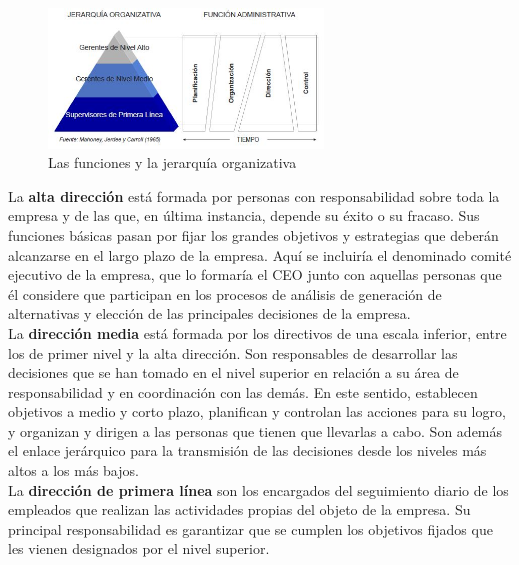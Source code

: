 \documentclass[12pt]{article}
\theoremstyle{definition_wo_parentheses}
\begin{document}
\begin{figure}[H]
\centering
\includegraphics[width=0.65\textwidth]{jerarquia}
\caption{Las funciones y la jerarquía organizativa}
\label{fig:jerarquia}
\end{figure}

La \textbf{alta dirección} está formada por personas con responsabilidad sobre toda la empresa y de las que, en última instancia, depende su éxito o su fracaso. Sus funciones básicas pasan por fijar los grandes objetivos y estrategias que deberán alcanzarse en el largo plazo de la empresa. Aquí se incluiría el denominado comité ejecutivo de la empresa, que lo formaría el CEO junto con aquellas personas que él considere que participan en los procesos de análisis de generación de alternativas y elección de las principales decisiones de la empresa.\\

La \textbf{dirección media} está formada por los directivos de una escala inferior, entre los de primer nivel y la alta dirección. Son responsables de desarrollar las decisiones que se han tomado en el nivel superior en relación a su área de responsabilidad y en coordinación con las demás. En este sentido, establecen objetivos a medio y corto plazo, planifican y controlan las acciones para su logro, y organizan y dirigen a las personas que tienen que llevarlas a cabo. Son además el enlace jerárquico para la transmisión de las decisiones desde los niveles más altos a los más bajos.\\

La \textbf{dirección de primera línea} son los encargados del seguimiento diario de los empleados que realizan las actividades propias del objeto de la empresa. Su principal responsabilidad es garantizar que se cumplen los objetivos fijados que les vienen designados por el nivel superior.
\end{document}
